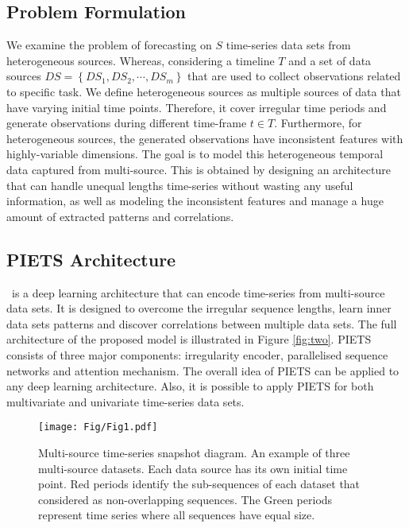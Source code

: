 \documentclass[conference]{IEEEtran}
\begin{document}
\subsection{Problem Formulation}
We examine the problem of forecasting on $S$ time-series data sets from heterogeneous sources. Whereas, considering a timeline $T$ and a set of data sources $DS = \left \{DS_1, DS_2, \cdots, DS_m \right \}$  that are used to collect observations related to specific task. We define heterogeneous sources as multiple sources of data that have varying initial time points. Therefore, it cover irregular time periods and generate observations during different time-frame $t\in T$.  Furthermore, for heterogeneous sources, the generated observations have inconsistent features with highly-variable dimensions. 
The goal is to model this heterogeneous temporal data captured from multi-source. This is obtained by designing an architecture that can handle unequal lengths time-series without wasting any useful information, as well as modeling the inconsistent features and manage a huge amount of extracted patterns and correlations.

\subsection{PIETS Architecture }

\name\   is a deep learning architecture that can encode time-series from multi-source data sets. It is designed to overcome the irregular sequence lengths, learn inner data sets patterns and discover correlations between multiple data sets. The full architecture of the proposed model is illustrated in Figure \ref{fig:two}. PIETS consists of three major components: irregularity encoder, parallelised sequence networks and attention mechanism. The overall idea of PIETS can be applied to any deep learning architecture. Also, it is possible to apply PIETS for both multivariate and univariate time-series data sets. 

  \begin{figure}[!t]
  \centering
  \texttt{[image: Fig/Fig1.pdf]}
  \caption{Multi-source time-series snapshot diagram. An example of three multi-source datasets. Each data source has its own initial time point. Red periods identify the sub-sequences of each dataset that considered as non-overlapping sequences. The Green periods represent time series where all sequences have equal size.}
    \label{fig:one}
\end{figure}
\end{document}
